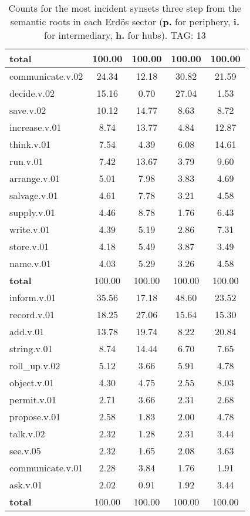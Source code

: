 \begin{table}[h!]
\begin{center}
\begin{tabular}{| l || c | c | c | c |}
{{\bf total}} & 100.00  & 100.00  & 100.00  & 100.00 \\\hline\hline\hline
communicate.v.02 & 24.34  & 12.18  & 30.82  & 21.59 \\\hline
decide.v.02 & 15.16  & 0.70  & 27.04  & 1.53 \\\hline
save.v.02 & 10.12  & 14.77  & 8.63  & 8.72 \\\hline
increase.v.01 & 8.74  & 13.77  & 4.84  & 12.87 \\\hline
think.v.01 & 7.54  & 4.39  & 6.08  & 14.61 \\\hline
run.v.01 & 7.42  & 13.67  & 3.79  & 9.60 \\\hline
arrange.v.01 & 5.01  & 7.98  & 3.83  & 4.69 \\\hline
salvage.v.01 & 4.61  & 7.78  & 3.21  & 4.58 \\\hline
supply.v.01 & 4.46  & 8.78  & 1.76  & 6.43 \\\hline
write.v.01 & 4.39  & 5.19  & 2.86  & 7.31 \\\hline
store.v.01 & 4.18  & 5.49  & 3.87  & 3.49 \\\hline
name.v.01 & 4.03  & 5.29  & 3.26  & 4.58 \\\hline\hline
{{\bf total}} & 100.00  & 100.00  & 100.00  & 100.00 \\\hline\hline\hline
inform.v.01 & 35.56  & 17.18  & 48.60  & 23.52 \\\hline
record.v.01 & 18.25  & 27.06  & 15.64  & 15.30 \\\hline
add.v.01 & 13.78  & 19.74  & 8.22  & 20.84 \\\hline
string.v.01 & 8.74  & 14.44  & 6.70  & 7.65 \\\hline
roll\_up.v.02 & 5.12  & 3.66  & 5.91  & 4.78 \\\hline
object.v.01 & 4.30  & 4.75  & 2.55  & 8.03 \\\hline
permit.v.01 & 2.71  & 3.66  & 2.31  & 2.68 \\\hline
propose.v.01 & 2.58  & 1.83  & 2.00  & 4.78 \\\hline
talk.v.02 & 2.32  & 1.28  & 2.31  & 3.44 \\\hline
see.v.05 & 2.32  & 1.65  & 2.08  & 3.63 \\\hline
communicate.v.01 & 2.28  & 3.84  & 1.76  & 1.91 \\\hline
ask.v.01 & 2.02  & 0.91  & 1.92  & 3.44 \\\hline\hline
{{\bf total}} & 100.00  & 100.00  & 100.00  & 100.00 \\\hline
\end{tabular}
\caption{Counts for the most incident synsets three step from the semantic roots in each Erd\"os sector ({\bf p.} for periphery, {\bf i.} for intermediary, {\bf h.} for hubs). TAG: 13}
\end{center}
\end{table}